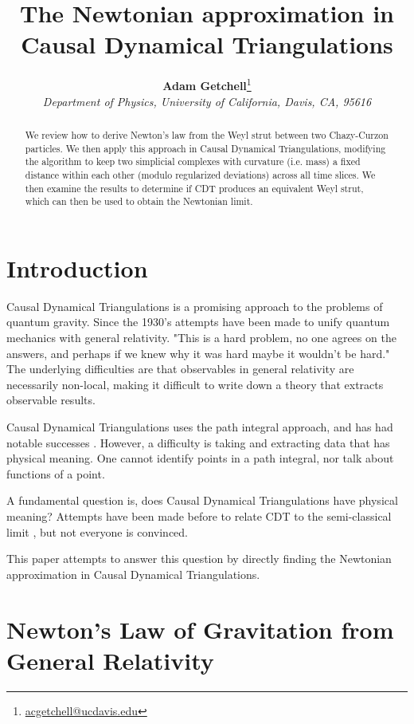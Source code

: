 \documentclass[12pt]{article}
\title{The Newtonian approximation in Causal Dynamical Triangulations}
\author{\textbf{Adam Getchell}\footnote{\href{mailto:acgetchell@ucdavis.edu}{acgetchell@ucdavis.edu}}\\\textit{Department of Physics, University of California, Davis, CA, 95616}}
\begin{document}
\maketitle

\begin{abstract}
We review how to derive Newton's law from the Weyl strut between two Chazy-Curzon particles. We then apply this approach in Causal Dynamical Triangulations, modifying the algorithm to keep two simplicial complexes with curvature (i.e. mass) a fixed distance within each other (modulo regularized deviations) across all time slices. We then examine the results to determine if CDT produces an equivalent Weyl strut, which can then be used to obtain the Newtonian limit.
\end{abstract}

\section{Introduction}

Causal Dynamical Triangulations \cite{cdt} is a promising approach to the problems of quantum gravity. Since the 1930's \cite{rovelli_notes_2000} attempts have been made to unify quantum mechanics with general relativity. "This is a hard problem, no one agrees on the answers, and perhaps if we knew why it was hard maybe it wouldn't be hard." The underlying difficulties are that observables in general relativity are necessarily non-local, making it difficult to write down a theory that extracts observable results.

Causal Dynamical Triangulations uses the path integral approach, and has had notable successes \cite{kommu_validation_2011}. However, a difficulty is taking and extracting data that has physical meaning. One cannot identify points in a path integral, nor talk about functions of a point.

A fundamental question is, does Causal Dynamical Triangulations have physical meaning? Attempts have been made before to relate CDT to the semi-classical limit \cite{ambjorn_semiclassical_2011,ambjorn_semiclassical}, but not everyone is convinced.

This paper attempts to answer this question by directly finding the Newtonian approximation in Causal Dynamical Triangulations.

\section{Newton's Law of Gravitation from General Relativity}
\label{sec:newtons-law}
\end{document}
